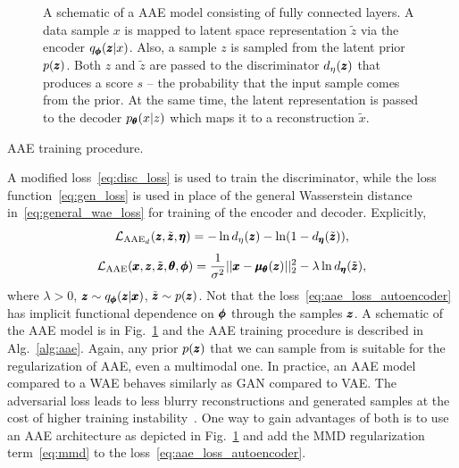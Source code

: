 \begin{figure}
\centering{}\caption{A schematic of a AAE model consisting of fully connected layers. A data sample $x$ is mapped to latent space representation $\tilde{z}$ via the encoder $q_{\pmb{{\phi}}}(\pmb{{z}}|x)$. Also, a sample $z$ is sampled from the latent prior $p(\pmb{{z}})$. Both $z$ and $\tilde{z}$ are passed to the discriminator $d_{\eta}(\pmb{{z}})$ that produces a score $s$ -- the probability that the input sample comes from the prior. At the same time, the latent representation is passed to the decoder $p_{\pmb{{\theta}}}(x|z)$ which maps it to a reconstruction $\tilde{x}$.}
\label{fig:aae}
\end{figure}

\begin{algorithm}

\caption{AAE training procedure.}
\label{alg:aae}
\end{algorithm}

A modified loss~\eqref{eq:disc_loss} is used to train the discriminator, while the loss function~\eqref{eq:gen_loss} is used in place of the general Wasserstein distance in~\eqref{eq:general_wae_loss} for training of the encoder and decoder. Explicitly,
\begin{equation} \label{eq:aae_loss_disc}
\mathcal{L}_{\text{AAE}_d}(\pmb{{z}},\tilde{\pmb{{z}}}, \pmb{{\eta}})= - \ln d_{\eta}(\pmb{{z}}) - \ln(1-d_{\pmb{{\eta}}}(\tilde{\pmb{{z}}})),
\end{equation}
\begin{equation} \label{eq:aae_loss_autoencoder}
\mathcal{L}_{\text{AAE}}(\pmb{{x}},\pmb{{z}},\tilde{\pmb{{z}}}, \pmb{{\theta}}, \pmb{{\phi}}) = \frac{1}{\sigma^2}||\pmb{{x}}-\pmb{{\mu}}_{\pmb{{\theta}}}(\pmb{{z}})||_{2}^{2} -\lambda\ln d_{\pmb{{\eta}}}(\tilde{\pmb{{z}}}),
\end{equation}
where $\lambda>0$, $\pmb{{z}} \sim q_{\pmb{{\phi}}}(\pmb{{z}}|\pmb{{x}})$, $\tilde{\pmb{{z}}} \sim p(\pmb{{z}})$. Not that the loss~\eqref{eq:aae_loss_autoencoder} has implicit functional dependence on $\pmb{{\phi}}$ through the samples $\pmb{{z}}$.  A schematic of the AAE model is in Fig.~\ref{fig:aae} and the AAE training procedure is described in Alg.~\ref{alg:aae}. Again, any prior $p(\pmb{{z}})$ that we can sample from is suitable for the regularization of AAE, even a multimodal one. In practice, an AAE model compared to a WAE behaves similarly as GAN compared to VAE. The adversarial loss leads to less blurry reconstructions and generated samples at the cost of higher training instability~\cite{tolstikhin2017wasserstein}. One way to gain advantages of both is to use an AAE architecture as depicted in Fig.~\ref{fig:aae} and add the MMD regularization term~\eqref{eq:mmd} to the loss~\eqref{eq:aae_loss_autoencoder}.

